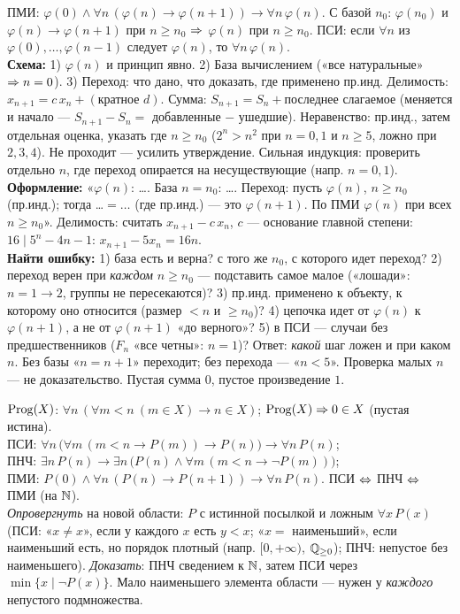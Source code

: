{
ПМИ: $\varphi(0)\wedge\forall n\,(\varphi(n)\to\varphi(n+1))\to\forall n\,\varphi(n)$. С базой $n_0$: $\varphi(n_0)$ и $\varphi(n)\to\varphi(n+1)$ при $n\ge n_0$ $\Rightarrow$ $\varphi(n)$ при $n\ge n_0$. ПСИ: если $\forall n$ из $\varphi(0),\dots,\varphi(n-1)$ следует $\varphi(n)$, то $\forall n\,\varphi(n)$.\\
\textbf{Схема:} 1) $\varphi(n)$ и принцип явно. 2) База вычислением («все натуральные» $\Rightarrow n=0$). 3) Переход: что дано, что доказать, где применено пр.инд. Делимость: $x_{n+1}=c\,x_n+(\text{кратное }d)$. Сумма: $S_{n+1}=S_n+$последнее слагаемое (меняется и начало — $S_{n+1}-S_n=$ добавленные $-$ ушедшие). Неравенство: пр.инд., затем отдельная оценка, указать где $n\ge n_0$ ($2^n>n^2$ при $n=0,1$ и $n\ge5$, ложно при $2,3,4$). Не проходит — усилить утверждение. Сильная индукция: проверить отдельно $n$, где переход опирается на несуществующие (напр. $n=0,1$).\\
\textbf{Оформление:} «$\varphi(n)$: \dots. База $n=n_0$: \dots. Переход: пусть $\varphi(n)$, $n\ge n_0$ (пр.инд.); тогда \dots $=\dots$ (где пр.инд.) — это $\varphi(n+1)$. По ПМИ $\varphi(n)$ при всех $n\ge n_0$». Делимость: считать $x_{n+1}-c\,x_n$, $c$ — основание главной степени: $16\mid5^n-4n-1$: $x_{n+1}-5x_n=16n$.\\
\textbf{Найти ошибку:} 1) база есть и верна? с того же $n_0$, с которого идет переход? 2) переход верен при \emph{каждом} $n\ge n_0$ — подставить самое малое («лошади»: $n=1\to2$, группы не пересекаются)? 3) пр.инд. применено к объекту, к которому оно относится (размер $<n$ и $\ge n_0$)? 4) цепочка идет от $\varphi(n)$ к $\varphi(n+1)$, а не от $\varphi(n+1)$ «до верного»? 5) в ПСИ — случаи без предшественников ($F_n$ «все четны»: $n=1$)? Ответ: \emph{какой} шаг ложен и при каком $n$.
\trap Без базы «$n=n+1$» переходит; без перехода — «$n<5$». Проверка малых $n$ — не доказательство. Пустая сумма $0$, пустое произведение $1$.

$\mathrm{Prog}(X)$: $\forall n\,(\forall m<n\ (m\in X)\to n\in X)$; $\mathrm{Prog}(X)\Rightarrow0\in X$ (пустая истина).\\
ПСИ: $\forall n\,\bigl(\forall m\,(m<n\to P(m))\to P(n)\bigr)\to\forall n\,P(n)$;\\
ПНЧ: $\exists n\,P(n)\to\exists n\,\bigl(P(n)\wedge\forall m\,(m<n\to\neg P(m))\bigr)$;\\
ПМИ: $P(0)\wedge\forall n\,(P(n)\to P(n+1))\to\forall n\,P(n)$. ПСИ $\Leftrightarrow$ ПНЧ $\Leftrightarrow$ ПМИ (на $\mathbb{N}$).\\
\emph{Опровергнуть} на новой области: $P$ с истинной посылкой и ложным $\forall x\,P(x)$ (ПСИ: «$x\ne x$», если у каждого $x$ есть $y<x$; «$x=$ наименьший», если наименьший есть, но порядок плотный (напр. $[0,+\infty)$, $\mathbb{Q}_{\ge0}$); ПНЧ: непустое без наименьшего). \emph{Доказать}: ПНЧ сведением к $\mathbb{N}$, затем ПСИ через $\min\{x\mid\neg P(x)\}$.
\trap Мало наименьшего элемента области — нужен у \emph{каждого} непустого подмножества.

}

